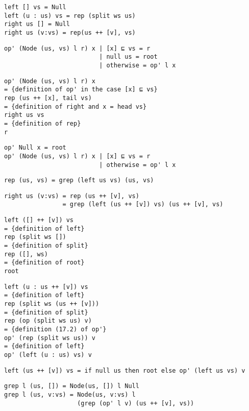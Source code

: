 \begin{verbatim}
left [] vs = Null
left (u : us) vs = rep (split ws us)
right us [] = Null
right us (v:vs) = rep(us ++ [v], vs)
\end{verbatim}

\begin{verbatim}
op' (Node (us, vs) l r) x | [x] ⊑ vs = r
                          | null us = root
                          | otherwise = op' l x
\end{verbatim}

\begin{verbatim}
op' (Node (us, vs) l r) x
= {definition of op' in the case [x] ⊑ vs}
rep (us ++ [x], tail vs)
= {definition of right and x = head vs}
right us vs
= {definition of rep}
r
\end{verbatim}

\begin{verbatim}
op' Null x = root
op' (Node (us, vs) l r) x | [x] ⊑ vs = r
                          | otherwise = op' l x
\end{verbatim}

\begin{verbatim}
rep (us, vs) = grep (left us vs) (us, vs)
\end{verbatim}

\begin{verbatim}
right us (v:vs) = rep (us ++ [v], vs)
                = grep (left (us ++ [v]) vs) (us ++ [v], vs)
\end{verbatim}

\begin{verbatim}
left ([] ++ [v]) vs
= {definition of left}
rep (split ws [])
= {definition of split}
rep ([], ws)
= {definition of root}
root
\end{verbatim}

\begin{verbatim}
left (u : us ++ [v]) vs
= {definition of left}
rep (split ws (us ++ [v]))
= {definition of split}
rep (op (split ws us) v)
= {definition (17.2) of op'}
op' (rep (split ws us)) v
= {definition of left}
op' (left (u : us) vs) v
\end{verbatim}

\begin{verbatim}
left (us ++ [v]) vs = if null us then root else op' (left us vs) v
\end{verbatim}

\begin{verbatim}
grep l (us, []) = Node(us, []) l Null
grep l (us, v:vs) = Node(us, v:vs) l
                    (grep (op' l v) (us ++ [v], vs))
\end{verbatim}



